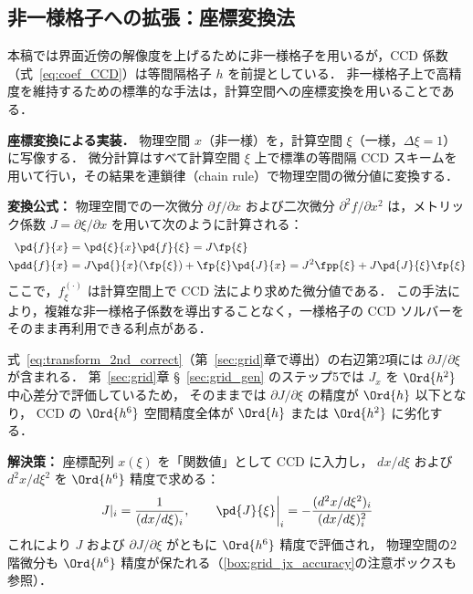 %
%
\subsection{非一様格子への拡張：座標変換法}
\label{sec:ccd_metric}

本稿では界面近傍の解像度を上げるために非一様格子を用いるが，CCD 係数（式~\eqref{eq:coef_CCD}）は等間隔格子 $h$ を前提としている．
非一様格子上で高精度を維持するための標準的な手法は，計算空間への座標変換を用いることである．

\noindent\textbf{座標変換による実装．}
物理空間 $x$（非一様）を，計算空間 $\xi$（一様，$\Delta\xi=1$）に写像する．
微分計算はすべて計算空間 $\xi$ 上で標準の等間隔 CCD スキームを用いて行い，その結果を連鎖律（chain rule）で物理空間の微分値に変換する．

\textbf{変換公式：}
物理空間での一次微分 $\partial f/\partial x$ および二次微分 $\partial^2 f/\partial x^2$ は，メトリック係数 $J = \partial \xi / \partial x$ を用いて次のように計算される：
\begin{align}
  \pd{f}{x} &= \pd{\xi}{x}\pd{f}{\xi} = J \fp{\xi} \\
  \pdd{f}{x} &= J \pd{}{x}\!\left(\fp{\xi}\right) + \fp{\xi}\pd{J}{x} = J^2 \fpp{\xi} + J \pd{J}{\xi} \fp{\xi}
\end{align}
ここで，$f^{(\cdot)}_\xi$ は計算空間上で CCD 法により求めた微分値である．
この手法により，複雑な非一様格子係数を導出することなく，一様格子の CCD ソルバーをそのまま再利用できる利点がある．

\medskip

\begin{tcolorbox}[warnbox, title={$\partial J/\partial\xi$ の精度：全体精度への影響}]
式~\eqref{eq:transform_2nd_correct}（第~\ref{sec:grid}章で導出）の右辺第2項には $\partial J/\partial\xi$ が含まれる．
第~\ref{sec:grid}章 §~\ref{sec:grid_gen} のステップ5では $J_x$ を $\Ord{h^2}$ 中心差分で評価しているため，
そのままでは $\partial J/\partial\xi$ の精度が $\Ord{h}$ 以下となり，
CCD の $\Ord{h^6}$ 空間精度全体が $\Ord{h}$ または $\Ord{h^2}$ に劣化する．

\textbf{解決策：} 座標配列 $x(\xi)$ を「関数値」として CCD に入力し，
$dx/d\xi$ および $d^2x/d\xi^2$ を $\Ord{h^6}$ 精度で求める：
\[
  J|_i = \frac{1}{(dx/d\xi)_i}, \qquad
  \pd{J}{\xi}\bigg|_i = -\frac{(d^2x/d\xi^2)_i}{(dx/d\xi)_i^2}
\]
これにより $J$ および $\partial J/\partial\xi$ がともに $\Ord{h^6}$ 精度で評価され，
物理空間の2階微分も $\Ord{h^6}$ 精度が保たれる（\ref{box:grid_jx_accuracy}の注意ボックスも参照）．
\end{tcolorbox}

